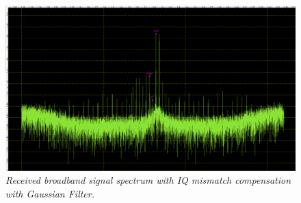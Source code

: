 \documentclass[en,printmode]{mgr}
\begin{document}
   		\begin{figure}[H]
    		\centering
   			\includegraphics[width=\textwidth]{plots/my_multi_gauss.png}
   		 	\caption{\textit{Received broadband signal spectrum with IQ mismatch compensation with
   		 	Gaussian Filter.}}
   		\end{figure}	
   		
\end{document}
